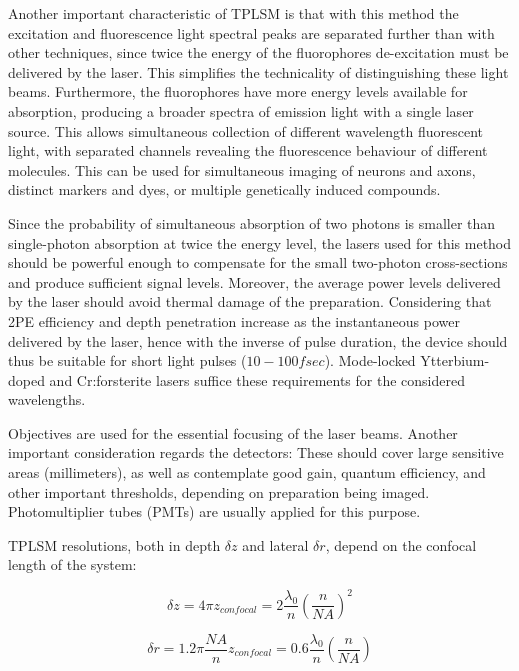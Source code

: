 Another important characteristic of TPLSM is that with this method the excitation and fluorescence light spectral peaks are separated further than with other techniques, since twice the energy of the fluorophores de-excitation must be delivered by the laser. This simplifies the technicality of distinguishing these light beams. Furthermore, the fluorophores have more energy levels available for absorption, producing a broader spectra of emission light with a single laser source. This allows simultaneous collection of different wavelength fluorescent light, with separated channels revealing the fluorescence behaviour of different molecules. This can be used for simultaneous imaging of neurons and axons, distinct markers and dyes, or multiple genetically induced compounds.

Since the probability of simultaneous absorption of two photons is smaller than single-photon absorption at twice the energy level, the lasers used for this method should be powerful enough to compensate for the small two-photon cross-sections and produce sufficient signal levels. Moreover, the average power levels delivered by the laser should avoid thermal damage of the preparation. Considering that 2PE efficiency and depth penetration increase as the instantaneous power delivered by the laser, hence with the inverse of pulse duration, the device should thus be suitable for short light pulses ($10-100 fsec$). Mode-locked Ytterbium-doped and Cr:forsterite lasers suffice these requirements for the considered wavelengths.

Objectives are used for the essential focusing of the laser beams. Another important consideration regards the detectors: These should cover large sensitive areas (millimeters), as well as contemplate good gain, quantum efficiency, and other important thresholds, depending on preparation being imaged. Photomultiplier tubes (PMTs) are usually applied for this purpose.

TPLSM resolutions, both in depth $\delta z$ and lateral $\delta r$, depend on the confocal length of the system:

\begin{equation}
\delta z = 4 \pi z_{confocal} = 2 \dfrac{\lambda _0}{n}\left( \dfrac{n}{NA} \right) ^2
\end{equation}

\begin{equation}
\delta r = 1.2 \pi \dfrac{NA}{n} z_{confocal} = 0.6 \dfrac{\lambda _0}{n}\left( \dfrac{n}{NA} \right)
\end{equation}

